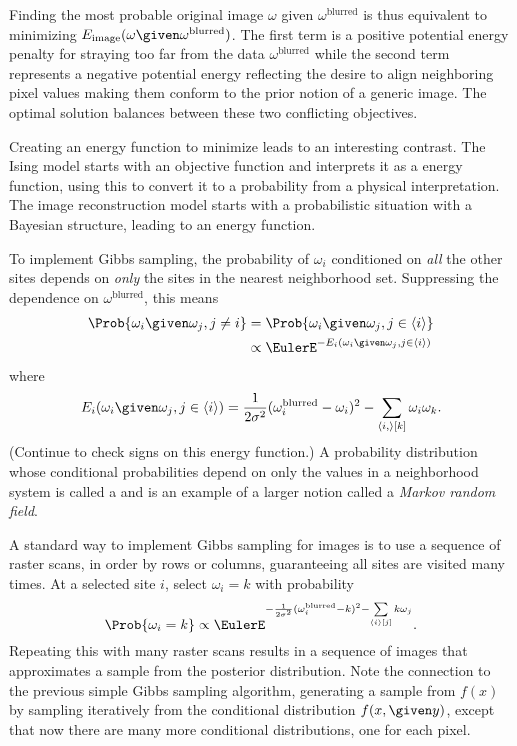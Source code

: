 \documentclass[12pt]{article}
\begin{document}
Finding the most probable original image \( \omega \) given \( \omega^{\text
{blurred}} \) is thus equivalent to minimizing \( E_{\text{image}}(\omega
\given \omega^{\text{blurred}}) \).  The first term is a positive
potential energy
penalty for
straying too far from the data \( \omega^{\text{blurred}} \) while the
second term represents a negative potential energy reflecting
the desire to align neighboring pixel values
making them conform to the prior notion of a generic image.  The optimal
solution balances between these two conflicting objectives.

Creating an energy function to minimize leads to an interesting
contrast.  The Ising model starts
with an objective function and interprets it as a energy function, using
this to convert it to a probability from a physical interpretation.  The
image reconstruction model starts with a probabilistic situation with a
Bayesian structure, leading to an energy function.

To implement Gibbs sampling, the
probability of \( \omega_i \) conditioned on \emph{all} the other sites depends
on \emph{only} the sites in the nearest neighborhood set.  Suppressing the
dependence on \( \omega^{\text{blurred}} \), this means
\begin{align*}
    \Prob{\omega_i \given \omega_j, j \ne i }  &= \Prob
    { \omega_i \given \omega_j, j \in \langle i\rangle } \\
    & \propto \EulerE^{-E_i(\omega_i \given \omega_j, j \in
    \langle i \rangle)}
\end{align*}
where
\[
  E_i(\omega_i \given \omega_j, j \in \langle i \rangle) =
  \frac{1}{2\sigma^2}(\omega_i^{\text{blurred}}-\omega_i)^2 -
    \sum\limits_{\langle i,\rangle[k]} \omega_i\omega_k.
\] (Continue to check signs on this
energy function.) A probability distribution whose conditional probabilities depend on
only the values in a neighborhood system is called a %
and is an example of a larger notion called a \emph{Markov random field}.%

A standard way to implement Gibbs sampling for images is to use a
sequence of raster scans, in order by rows or columns, guaranteeing all
sites are visited many times.  At a selected site \( i \), select \(
\omega_i = k \) with probability
\[
    \Prob{\omega_i = k} \propto \EulerE^{-\frac{1}{2\sigma^2}(\omega_i^{\text
    {blurred}}-k)^2 - \sum\limits_{\langle i \rangle[j]} k \omega_j}.
\] Repeating this with many raster scans results in a sequence of images
that approximates a sample from the posterior distribution. Note the
connection to the previous simple Gibbs sampling algorithm, generating a
sample from \( f(x) \) by sampling iteratively from the conditional
distribution \( f(x, \given y) \),
except that now there are many more conditional distributions, one
for each pixel.
\end{document}

